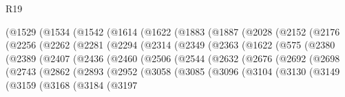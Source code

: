 \begin{lexlean}{R19}
\begin{coremodule}
{{{{{{{{{{{          (@1529
            (@1534
              (@1542
                (@1614
                  (@1622
                    (@1883
                      (@1887
                        (@2028
                          (@2152
                            (@2176
                              (@2256
                                (@2262
                                  (@2281
                                    (@2294
                                      (@2314
                                        (@2349
                                          (@2363
                                            (@1622
                                              (@575
                                                (@2380
                                                  (@2389
                                                    (@2407
                                                      (@2436
                                                        (@2460
                                                          (@2506
                                                            (@2544
                                                              (@2632
                                                                (@2676
                                                                  (@2692
                                                                    (@2698
                                                                      (@2743
                                                                        (@2862
                                                                          (@2893
                                                                            (@2952
                                                                              (@3058
                                                                                (@3085
                                                                                  (@3096
                                                                                    (@3104
                                                                                      (@3130
                                                                                        (@3149
                                                                                          (@3159
                                                                                            (@3168
                                                                                              (@3184
                                                                                                (@3197
}}}}}}}}}}}
\end{coremodule}
\end{lexlean}
